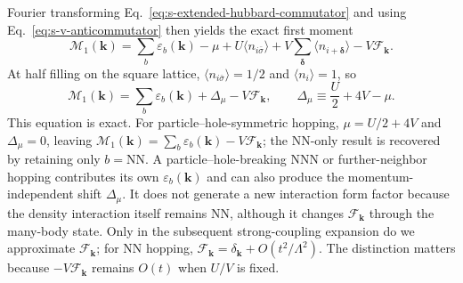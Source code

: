 \documentclass[10pt]{article}
\newcommand{\dk}{\delta_{\mathbf{k}}}
\begin{document}
Fourier transforming Eq.~\ref{eq:s-extended-hubbard-commutator} and using Eq.~\ref{eq:s-v-anticommutator} then yields the exact first moment
\begin{equation}
 \mathcal M_1(\mathbf k)
 =\sum_b\varepsilon_b(\mathbf k)-\mu
 +U\langle n_{i\bar\sigma}\rangle
 +V\sum_{\boldsymbol\delta}
 \langle n_{i+\boldsymbol\delta}\rangle
 -V\mathcal F_{\mathbf k}.
 \label{eq:s-uv-m1-general}
\end{equation}
At half filling on the square lattice, $\langle n_{i\bar\sigma}\rangle=1/2$ and $\langle n_i\rangle=1$, so
\begin{equation}
 \boxed{\mathcal M_1(\mathbf k)
 =\sum_b\varepsilon_b(\mathbf k)+\Delta_\mu
 -V\mathcal F_{\mathbf k},
 \qquad \Delta_\mu\equiv\frac U2+4V-\mu.}
 \label{eq:s-uv-m1-exact}
\end{equation}
This equation is exact. For particle--hole-symmetric hopping, $\mu=U/2+4V$ and $\Delta_\mu=0$, leaving $\mathcal M_1(\mathbf k)=\sum_b\varepsilon_b(\mathbf k)-V\mathcal F_{\mathbf k}$; the NN-only result is recovered by retaining only $b=\mathrm{NN}$. A particle--hole-breaking NNN or further-neighbor hopping contributes its own $\varepsilon_b(\mathbf k)$ and can also produce the momentum-independent shift $\Delta_\mu$. It does not generate a new interaction form factor because the density interaction itself remains NN, although it changes $\mathcal F_{\mathbf k}$ through the many-body state. Only in the subsequent strong-coupling expansion do we approximate $\mathcal F_{\mathbf k}$; for NN hopping, $\mathcal F_{\mathbf k}=\dk+O(t^2/\Lambda^2)$. The distinction matters because $-V\mathcal F_{\mathbf k}$ remains $O(t)$ when $U/V$ is fixed.
\end{document}
